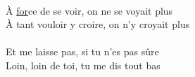 \\
À \underline{for}ce de se voir, on ne se voyait plus \\
À tant vouloir y croire, on n'y croyait plus \\
\\
Et me laisse pas, si tu n'es pas sûre \\
Loin, loin de toi, tu me dis tout bas
